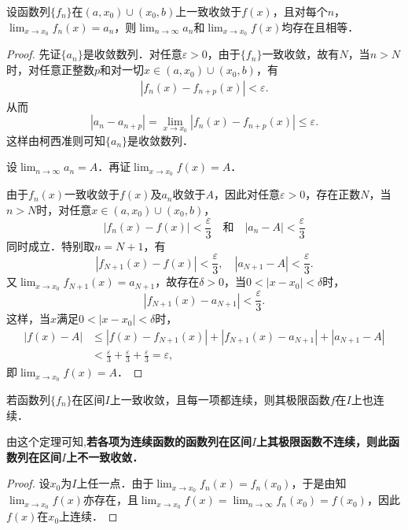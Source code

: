 \documentclass[../../main.tex]{subfiles}
\begin{document}
\begin{theorem}\label{theorem:定理13.8123}
设函数列\(\{f_n\}\)在\((a, x_0) \cup (x_0, b)\)上一致收敛于\(f(x)\)，且对每个\(n\)，\(\lim_{x \to x_0} f_n(x) = a_n\)，则\(\lim_{n \to \infty} a_n\)和\(\lim_{x \to x_0} f(x)\)均存在且相等．
\end{theorem}
\begin{proof}
先证\(\{a_n\}\)是收敛数列．对任意\(\varepsilon > 0\)，由于\(\{f_n\}\)一致收敛，故有\(N\)，当\(n > N\)时，对任意正整数\(p\)和对一切\(x \in (a, x_0) \cup (x_0, b)\)，有
\begin{align}
|f_n(x) - f_{n + p}(x)| < \varepsilon. \label{eq::--1}
\end{align}
从而
\[
|a_n - a_{n + p}| = \lim_{x \to x_0} |f_n(x) - f_{n + p}(x)| \leqslant \varepsilon.
\]
这样由柯西准则可知\(\{a_n\}\)是收敛数列．

设\(\lim_{n \to \infty} a_n = A\)．再证\(\lim_{x \to x_0} f(x) = A\)．

由于\(f_n(x)\)一致收敛于\(f(x)\)及\(a_n\)收敛于\(A\)，因此对任意\(\varepsilon > 0\)，存在正数\(N\)，当\(n > N\)时，对任意\(x \in (a, x_0) \cup (x_0, b)\)，
\[
|f_n(x) - f(x)| < \frac{\varepsilon}{3} \quad \text{和} \quad |a_n - A| < \frac{\varepsilon}{3}
\]
同时成立．特别取\(n = N + 1\)，有
\[
|f_{N + 1}(x) - f(x)| < \frac{\varepsilon}{3}, \quad |a_{N + 1} - A| < \frac{\varepsilon}{3}.
\]
又\(\lim_{x \to x_0} f_{N + 1}(x) = a_{N + 1}\)，故存在\(\delta > 0\)，当\(0 < |x - x_0| < \delta\)时，
\[
|f_{N + 1}(x) - a_{N + 1}| < \frac{\varepsilon}{3}.
\]
这样，当\(x\)满足\(0 < |x - x_0| < \delta\)时，
\begin{align*}
|f(x) - A| &\leqslant |f(x) - f_{N + 1}(x)| + |f_{N + 1}(x) - a_{N + 1}| + |a_{N + 1} - A| \\
&< \frac{\varepsilon}{3} + \frac{\varepsilon}{3} + \frac{\varepsilon}{3} = \varepsilon,
\end{align*}
即\(\lim_{x \to x_0} f(x) = A\)．

\end{proof}

\begin{theorem}[连续性]\label{theorem:定理13.98648}
若函数列\(\{f_n\}\)在区间\(I\)上一致收敛，且每一项都连续，则其极限函数\(f\)在\(I\)上也连续．
\end{theorem}
\begin{note}
由这个定理可知,\textbf{若各项为连续函数的函数列在区间\(I\)上其极限函数不连续，则此函数列在区间\(I\)上不一致收敛．}
\end{note}
\begin{proof}
设\(x_0\)为\(I\)上任一点．由于\(\lim_{x \to x_0} f_n(x) = f_n(x_0)\)，于是由知\(\lim_{x \to x_0} f(x)\)亦存在，且\(\lim_{x \to x_0} f(x) = \lim_{n \to \infty} f_n(x_0) = f(x_0)\)，因此\(f(x)\)在\(x_0\)上连续．

\end{proof}
\end{document}
